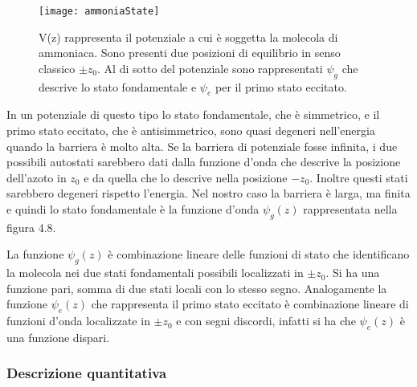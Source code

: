 \begin{figure}[!ht]
\vspace{0.1in}
\texttt{[image: ammoniaState]}	
\centering
\vspace{0.1in}
\caption{V(z) rappresenta il potenziale a cui \`e soggetta la molecola di ammoniaca. Sono presenti due posizioni di equilibrio in senso classico $\pm z_0$. Al di sotto del potenziale sono rappresentati $\psi_g$ che descrive lo stato fondamentale e $\psi_{e}$ per il primo stato eccitato.}
\end{figure}
In un potenziale di questo tipo lo stato fondamentale, che \`e simmetrico, e il primo stato eccitato, che \`e antisimmetrico, sono quasi degeneri nell'energia quando la barriera \`e molto alta. Se la barriera di potenziale fosse infinita, i due possibili autostati sarebbero dati dalla funzione d'onda che descrive la posizione dell'azoto in $z_0$ e da quella che lo descrive nella posizione $-z_0$. Inoltre questi stati sarebbero degeneri rispetto l'energia. Nel nostro caso la barriera \`e larga, ma finita e quindi lo stato fondamentale \`e la funzione d'onda $\psi_g(z)$ rappresentata nella figura 4.8. 
  
La funzione $\psi_g(z)$ \`e combinazione lineare delle funzioni di stato che identificano la molecola nei due stati fondamentali possibili localizzati in $\pm z_0$. Si ha una funzione pari, somma di due stati locali con lo stesso segno. Analogamente la funzione $\psi_e(z)$ che rappresenta il primo stato eccitato \`e combinazione lineare di funzioni d'onda localizzate in $\pm z_0$ e con segni discordi, infatti si ha che $\psi_e(z)$ \`e una funzione dispari.

\subsubsection{Descrizione quantitativa}

